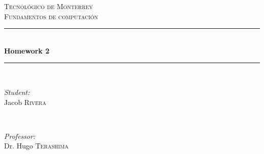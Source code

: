 \documentclass{article}
\begin{document}
\begin{titlepage}

    \newcommand{\HRule}{\rule{\linewidth}{0.5mm}} %

    \center %


    \textsc{\LARGE Tecnológico de Monterrey}\\[1.5cm] %
    \textsc{\Large Fundamentos de computación}\\[0.5cm] %


    \HRule \\[0.4cm]
    { \huge \bfseries Homework 2}\\[0.4cm] %
    \HRule \\[1.5cm]


    \begin{minipage}{0.4\textwidth}
    \begin{flushleft} \large
    \emph{Student:}\\
    Jacob \textsc{Rivera} %
    \end{flushleft}
    \end{minipage}
    ~
    \begin{minipage}{0.4\textwidth}
    \begin{flushright} \large
    \emph{Professor:} \\
    Dr. Hugo \textsc{Terashima} %
    \end{flushright}
    \end{minipage}\\[2cm]


\end{titlepage}
\end{document}
